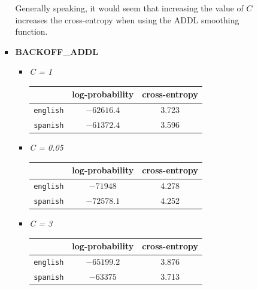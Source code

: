 \documentclass[11pt]{article}
\begin{document}
\begin{enumerate}
\begin{enumerate}[label=(\alph*)]
\begin{itemize}
\begin{itemize}
\begin{center}
\begin{tabular}{| r || c | c |}
				\end{tabular}\end{center} \vspace{8pt}

			\end{itemize} \vspace{8pt}

			Generally speaking, it would seem that increasing the value of $C$ increases the cross-entropy when using the ADDL smoothing function. 
			\vspace{8pt} \\

		\item[] \hspace{-24pt} \textbf{BACKOFF\_ADDL}
			\begin{itemize}
			\item[] \hspace{-24pt} \textit{C = 1} 	 \vspace{4pt}
				\begin{center}\begin{tabular}{| r || c | c |}
				\hline
									& log-probability	& cross-entropy \\
				\hline \hline
				\texttt{english}	& $-62616.4$		& 3.723			\\
				\texttt{spanish}	& $-61372.4$		& 3.596			\\
				\hline
				
				\end{tabular}\end{center}
				
			\item[] \hspace{-24pt} \textit{C = 0.05} \vspace{4pt}
				\begin{center}\begin{tabular}{| r || c | c |}
				\hline
									& log-probability	& cross-entropy \\
				\hline \hline
				\texttt{english}	& $-71948$			& 4.278			\\
				\texttt{spanish}	& $-72578.1$		& 4.252			\\
				\hline
				
				\end{tabular}\end{center}

			\item[] \hspace{-24pt} \textit{C = 3} 	 \vspace{4pt} \\
				\begin{center}\begin{tabular}{| r || c | c |}
				\hline
									& log-probability	& cross-entropy \\
				\hline \hline
				\texttt{english}	& $-65199.2$		& 3.876			\\
				\texttt{spanish}	& $-63375$			& 3.713			\\
				\hline
				

\end{tabular}
\end{center}
\end{itemize}
\end{itemize}
\end{enumerate}
\end{enumerate}
\end{document}
